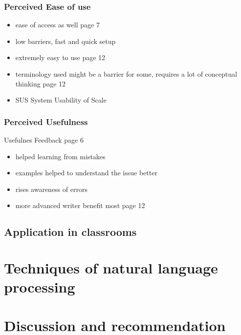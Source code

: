 \documentclass[runningheads]{llncs}
\begin{document}
\subsubsection{Perceived Ease of use}
\begin{itemize}
    \item ease of access as well \citep{nova_utilizing_2018} page 7
    \item low barriers, fast and quick setup
    \item extremely easy to use \citep{cavaleri_you_2016} page 12
    \item terminology used might be a barrier for some, requires a lot of conceptual thinking \citep{cavaleri_you_2016} page 12
    \item SUS System Usability of Scale \citep{ventayen_graduate_2018}
\end{itemize}

\subsubsection{Perceived Usefulness} 
Usefulnes Feedback \citep{nova_utilizing_2018} page 6 
\begin{itemize}
    \item helped learning from mistakes
    \item examples helped to understand the issue better
    \item rises awareness of errors
    \item more advanced writer benefit most \citep{cavaleri_you_2016} page 12
\end{itemize}

\subsection{Application in classrooms}


\section{Techniques of natural language processing}

\section{Discussion and recommendation}
\end{document}
